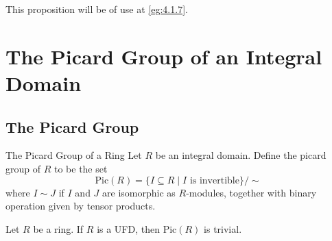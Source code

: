 \documentclass[a4paper]{article}
\begin{document}
This proposition will be of use at \ref{eg:4.1.7}. 

\pagebreak
\section{The Picard Group of an Integral Domain}
\subsection{The Picard Group}
\begin{defn}{The Picard Group of a Ring}{} Let $R$ be an integral domain. Define the picard group of $R$ to be the set $$\text{Pic}(R)=\{I\subseteq R\;|\;I\text{ is invertible}\}/\sim$$ where $I\sim J$ if $I$ and $J$ are isomorphic as $R$-modules, together with binary operation given by tensor products. 
\end{defn}

\begin{lmm}{}{} Let $R$ be a ring. If $R$ is a UFD, then $\text{Pic}(R)$ is trivial. 
\end{lmm}
\end{document}
